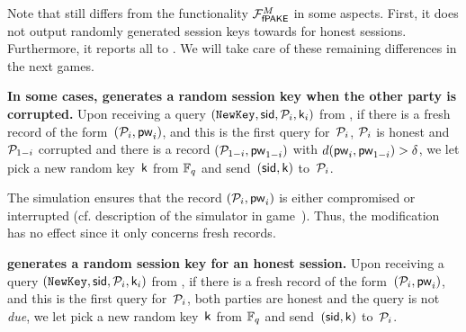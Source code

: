 \begin{games}
Note that \Func still differs from the functionality $\mathcal{F}_\textsf{fPAKE}^M$ in some aspects. First, it does not output randomly generated session keys towards \Env for honest sessions. Furthermore, it reports all \passwords to \Sim. We will take care of these remaining differences in the next games.

\textbf{In some cases, \Func generates a random session key when the other party is corrupted.}
Upon receiving a \NewKey query $(\texttt{NewKey},\mathsf{sid},\mathcal{P}_{i},\mathsf{k}_{i})$ from \Sim, if there is a fresh record of the form~$(\mathcal{P}_{i},\mathsf{pw}_{i})$, and this is the first \NewKey query for~$\mathcal{P}_{i}$, $\mathcal{P}_{i}$ is honest and $\mathcal{P}_{1-i}$ corrupted and there is a record $(\mathcal{P}_{1-i},\mathsf{pw}_{1-i})$ with $d(\mathsf{pw}_{i},\mathsf{pw}_{1-i}) > \delta$, we let \Func pick a new random key~$\mathsf{k}$ from $\mathbb{F}_q$ and send~$(\mathsf{sid},\mathsf{k})$ to~$\mathcal{P}_{i}$. 

The simulation ensures that the record $(\mathcal{P}_{i},\mathsf{pw}_{i})$ is either compromised or interrupted (cf. description of the simulator in game~). Thus, the modification has no effect since it only concerns fresh records.

\textbf{\Func generates a random session key for an honest session.}
Upon receiving a \NewKey query $(\texttt{NewKey},\mathsf{sid},\mathcal{P}_{i},\mathsf{k}_{i})$ from \Sim, if there is a fresh record of the form~$(\mathcal{P}_{i},\mathsf{pw}_{i})$, and this is the first \NewKey query for~$\mathcal{P}_{i}$, both parties are honest and the \NewKey query is not \emph{due}, we let \Func pick a new random key~$\mathsf{k}$ from $\mathbb{F}_q$ and send~$(\mathsf{sid},\mathsf{k})$ to~$\mathcal{P}_{i}$. 


\end{games}
